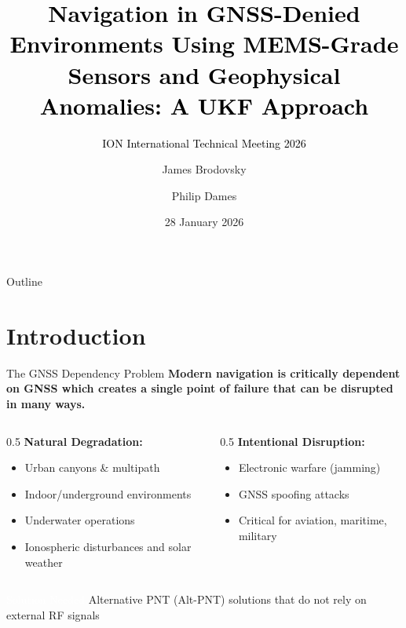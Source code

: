 \documentclass[aspectratio=169]{beamer}
\title[MEMS-GeoNav: UKF]{\textcolor{black}{Navigation in GNSS-Denied Environments Using MEMS-Grade Sensors and Geophysical Anomalies: A UKF Approach}}
\subtitle{\textcolor{black}{ION International Technical Meeting 2026}}
\author{James Brodovsky \and Philip Dames}
\institute{Temple University}
\date{28 January 2026}
\begin{document}
\begin{frame}
\titlepage
\end{frame}

\begin{frame}{Outline}
\tableofcontents
\end{frame}

\section{Introduction}

\begin{frame}{The GNSS Dependency Problem}
    \textbf{Modern navigation is critically dependent on GNSS which creates a single point of failure that can be disrupted in many ways.}
    \vspace{1cm}
    \pause
\begin{columns}[t]
\begin{column}{0.5\textwidth}
\textbf{Natural Degradation:}
\begin{itemize}
    \item Urban canyons \& multipath
    \item Indoor/underground environments
    \item Underwater operations
    \item Ionospheric disturbances and solar weather
\end{itemize}
\pause
\end{column}
\begin{column}{0.5\textwidth}
\textbf{Intentional Disruption:}
\begin{itemize}
    \item Electronic warfare (jamming)
    \item GNSS spoofing attacks
    \item Critical for aviation, maritime, military
\end{itemize}
\end{column}
\end{columns}

\vspace{0.25cm}
\centering
\begin{alertblock}{\textcolor{white}{Solution Needed}}
Alternative PNT (Alt-PNT) solutions that do not rely on external RF signals
\end{alertblock}
\end{frame}
\end{document}
